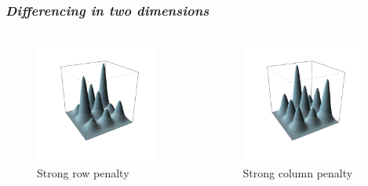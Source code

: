 \documentclass[12pt]{beamer}
\newcommand{\ms}{\scriptscriptstyle}
\begin{document}
\begin{frame}
\frametitle{\emph{Differencing in two dimensions}}


 \begin{columns}
\begin{column}{0.5\textwidth}
    \begin{center}
    \begin{figure}
    \graphicspath{{img/}}
 \includegraphics[width=4cm]{large-row-penalty}
 \caption{Strong row penalty}
 \end{figure}
     \end{center}
  \end{column}
\begin{column}{0.5\textwidth}  %
    \begin{center}
    \begin{figure}
    \graphicspath{{img/}}
 \includegraphics[width=4cm]{large-col-penalty}
 \caption{\small Strong column penalty}
 \end{figure}
     \end{center}
\end{column}
\end{columns}


\end{frame}






%
%
\end{document}

